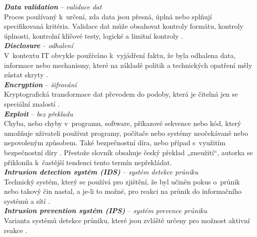 \textit{\textbf{Data validation}} -- \textit{validace dat} \label{app:a:datavalidation} \\ %
Proces používaný k~určení, zda data jsou přesná, úplná nebo splňují specifikovaná kritéria. Validace dat může obsahovat kontroly formátu, kontroly úplnosti, kontrolní klíčové testy, logické a limitní kontroly \cite[str. 122]{Slovnik2015}. \\

\textit{\textbf{Disclosure}} -- \textit{odhalení} \label{app:a:disclosure} \\ %
V~kontextu IT obvykle používáno k~vyjádření faktu, že byla odhalena data, informace nebo mechanismy, které na základě politik a technických opatření měly zůstat skryty \cite[str. 77]{Slovnik2015}. \\

\textit{\textbf{Encryption}} -- \textit{šifrování} \label{app:a:encryption} \\ %
Kryptografická transformace dat převodem do podoby, která je čitelná jen se speciální \mbox{znalostí} \cite[str. 115]{Slovnik2015}. \\

\textit{\textbf{Exploit}} -- \textit{bez překladu} \label{app:a:exploit} \\
Chyba, nebo chyby v~programu, software, příkazové sekvence nebo kód, který umožňuje uživateli používat programy, počítače nebo systémy neočekávaně nebo nepovoleným způsobem. Také bezpečnostní díra, nebo případ s~využitím bezpečnostní díry \cite[str. 135]{Slovnik2015}.  Přestože slovník obsahuje český překlad „zneužití“, autorka se přiklonila k~častější tendenci tento termín nepřekládat. \\

\textit{\textbf{Intrusion detection systém (IDS)}} -- \textit{systém detekce průniku} \label{app:a:ids} \\ %
Technický systém, který se používá pro zjištění, že byl učiněn pokus o~průnik nebo takový čin nastal, a je-li to možné, pro reakci na průnik do informačního systémů a sítí \cite[str. 114]{Slovnik2015}.  \\

\textit{\textbf{Intrusion prevention systém (IPS)}} -- \textit{systém prevence průniku} \label{app:a:ips} \\ %
Varianta systémů detekce průniku, které jsou zvláště určeny pro možnost aktivní reakce \cite[str. 114]{Slovnik2015}.  \\

